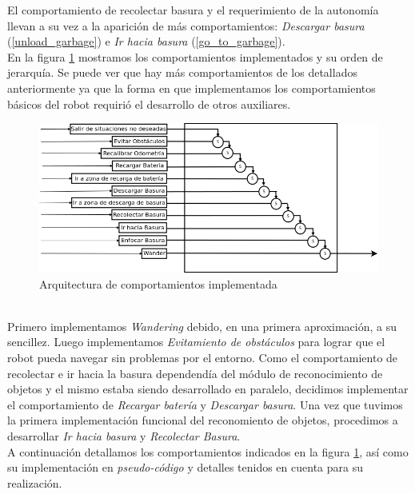 El comportamiento de recolectar basura y el requerimiento de la autonom\'ia
llevan a su vez a la aparici\'on de m\'as comportamientos: \emph{Descargar
basura} (\ref{unload_garbage}) e \emph{Ir hacia basura} (\ref{go_to_garbage}).
\\
En la figura \ref{fig:architecture} mostramos los comportamientos implementados
y su orden de jerarqu\'ia. Se puede ver que hay m\'as comportamientos de los
detallados anteriormente ya que la forma en que implementamos los
comportamientos b\'asicos del robot requiri\'o el desarrollo de otros
auxiliares.
\\
\begin{figure}[htp]
\begin{center}
\includegraphics[scale=0.5]{comportamientos/behavioursArchitecture2.png}
\caption{Arquitectura de comportamientos implementada}
\label{fig:architecture}
\end{center}
\end{figure}
\\
Primero implementamos \emph{Wandering} debido, en una primera aproximaci\'on,
a su sencillez. Luego implementamos \emph{Evitamiento de obst\'aculos}
para lograr que el robot pueda navegar sin problemas por el entorno. Como el
comportamiento de recolectar e ir hacia la basura dependend\'ia del m\'odulo
de reconocimiento de objetos y el mismo estaba siendo desarrollado en paralelo,
decidimos implementar el comportamiento de \emph{Recargar bater\'ia} y
\emph{Descargar basura}. Una vez que tuvimos la primera implementaci\'on
funcional del reconomiento de objetos, procedimos a desarrollar
\emph{Ir hacia basura} y \emph{Recolectar Basura}.
\\
A continuaci\'on detallamos los comportamientos indicados en la figura
\ref{fig:architecture}, as\'i como su implementaci\'on en 
\emph{pseudo-c\'odigo} y detalles tenidos en cuenta para su realizaci\'on.

